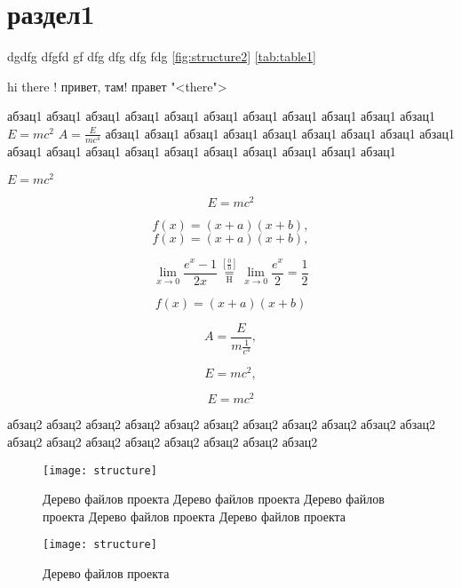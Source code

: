 \section{раздел1}
\lipsum[1-3]

dgdfg dfgfd gf dfg dfg dfg fdg \ref{fig:structure2}  \ref{tab:table1}

hi there !
привет, там!
правет   \cite{nik} \cite{nik} \cite{nik} \cite{nik}  \cite{test}  \cite{ivanov}  \cite{test}
\cite{kr_privet}
\cite{abadi}
\cite{abadi2}
"<there">

абзац1 абзац1 абзац1 абзац1 абзац1 абзац1 абзац1 абзац1 абзац1 абзац1 абзац1 
$E=mc^{2}$ $A=\frac{E}{mc^{4}}$
абзац1 абзац1  абзац1  абзац1  абзац1  абзац1  абзац1  абзац1  абзац1  абзац1  абзац1  абзац1  абзац1  абзац1  абзац1  абзац1  абзац1  абзац1  абзац1 

$E=mc^{2}$

\[E=mc^{2}\]

\begin{equation} 
 f(x)=(x+a)(x+b),
\end{equation}
\begin{equation} 
 f(x)=(x+a)(x+b),
\end{equation}

\[
 \lim_{x\to 0}{\frac{e^x-1}{2x}}
 \overset{\left[\frac{0}{0}\right]}{\underset{\mathrm{H}}{=}}
 \lim_{x\to 0}{\frac{e^x}{2}}={\frac{1}{2}}
\]

\begin{equation} 
 f(x)=(x+a)(x+b)
\end{equation}

\[A=\frac{E}{m\frac{1}{c^{4}}},\]

\[E=mc^{2},\]

\[E=mc^{2}\]

абзац2 абзац2 абзац2 абзац2 абзац2 абзац2 абзац2 абзац2 абзац2 абзац2 абзац2 абзац2 абзац2 абзац2 абзац2 абзац2 абзац2 абзац2 абзац2 


\begin{figure}
\centering
\texttt{[image: structure]}
\caption{Дерево файлов проекта Дерево файлов проекта Дерево файлов проекта Дерево файлов проекта Дерево файлов проекта }
\label{fig:structure}
\end{figure}

\begin{figure}
\centering
\texttt{[image: structure]}
\caption{Дерево файлов проекта}
\label{fig:structure1}
\end{figure}

